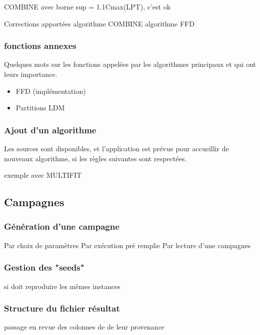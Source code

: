 \documentclass[a4paper,12pt]{report}
\theoremstyle{plain}				%
\theoremstyle{definition}				%
\begin{document}
COMBINE avec borne sup = 1.1Cmax(LPT), c'est ok

Corrections apportées
algorithme COMBINE
algorithme FFD

\subsubsection{fonctions annexes}\label{subsubsec:fonctions annexes}

Quelques mots sur les fonctions appelées par les algorithmes principaux et qui ont leurs importance.

\begin{itemize}
\item FFD \cite{rieck2010basic} (implémentation)
\item Partitions LDM
\end{itemize}

\subsubsection{Ajout d'un algorithme}\label{subsubsec:Ajout d'un algorithme}
Les sources sont disponibles, et l'application est prévue pour accueillir de nouveaux algorithme, si les règles suivantes sont respectées.

exemple avec MULTIFIT

\subsection{Campagnes}\label{subsec:Campagnes}

\subsubsection{Génération d'une campagne}\label{subsubsec:Génération d'une campagne}
Par choix de paramètres
Par exécution pré remplie
Par lecture d'une campagnes

\subsubsection{Gestion des "seeds"}\label{subsubsec:Gestion des "seeds"}
si doit reproduire les mêmes instances


\subsubsection{Structure du fichier résultat}\label{subsubsec:Structure du fichier résultat}

passage en revue des colonnes de de leur provenance
\end{document}
